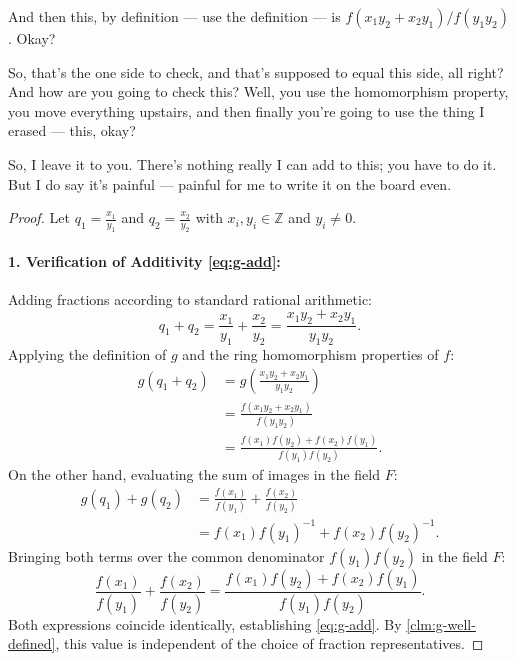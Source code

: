 \begin{speech}[00:31:50 - 00:32:50]
And then this, by definition --- use the definition --- is $f(x_1 y_2 + x_2 y_1)/f(y_1 y_2)$.  Okay?

So, that's the one side to check, and that's supposed to equal this side, all right? And how are you going to check this? Well, you use the homomorphism property, you move everything upstairs, and then finally you're going to use the thing I erased --- this, okay?

So, I leave it to you. There's nothing really I can add to this; you have to do it. But I do say it's painful --- painful for me to write it on the board even.
\end{speech}

\begin{content}

\begin{proof}
Let $q_1 = \frac{x_1}{y_1}$ and $q_2 = \frac{x_2}{y_2}$ with $x_i, y_i \in \mathbb{Z}$ and $y_i \ne 0$.

\paragraph{1. Verification of Additivity \eqref{eq:g-add}:}
Adding fractions according to standard rational arithmetic:
\[
q_1 + q_2 = \frac{x_1}{y_1} + \frac{x_2}{y_2} = \frac{x_1 y_2 + x_2 y_1}{y_1 y_2}.
\]
Applying the definition of $g$ and the ring homomorphism properties of $f$:
\begin{align*}
g(q_1 + q_2) &= g\left(\frac{x_1 y_2 + x_2 y_1}{y_1 y_2}\right) \\
&= \frac{f(x_1 y_2 + x_2 y_1)}{f(y_1 y_2)} \\
&= \frac{f(x_1)f(y_2) + f(x_2)f(y_1)}{f(y_1)f(y_2)}.
\end{align*}
On the other hand, evaluating the sum of images in the field $F$:
\begin{align*}
g(q_1) + g(q_2) &= \frac{f(x_1)}{f(y_1)} + \frac{f(x_2)}{f(y_2)} \\
&= f(x_1)f(y_1)^{-1} + f(x_2)f(y_2)^{-1}.
\end{align*}
Bringing both terms over the common denominator $f(y_1)f(y_2)$ in the field $F$:
\[
\frac{f(x_1)}{f(y_1)} + \frac{f(x_2)}{f(y_2)} = \frac{f(x_1)f(y_2) + f(x_2)f(y_1)}{f(y_1)f(y_2)}.
\]
Both expressions coincide identically, establishing \eqref{eq:g-add}. By \cref{clm:g-well-defined}, this value is independent of the choice of fraction representatives.


\end{proof}
\end{content}
